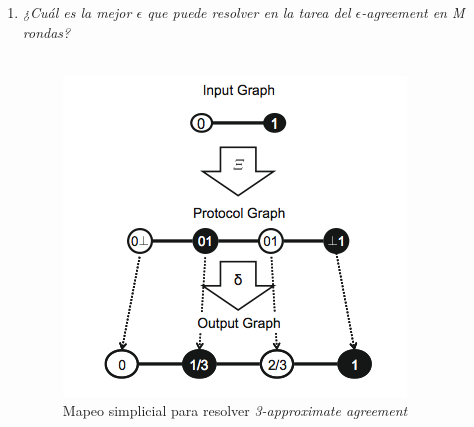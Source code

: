 \documentclass{article}
\begin{document}
\begin{enumerate}
{\begin{enumerate}
{      En la primera ronda(\textit{figura 4}) podemos decir que el complejo es el mismo
      al del problema visto en clase, esto se debe a que cada proceso ocupa el único espacio
      de memoria del cual dispone, teniendo como información inicial, lo que él dijo (0 ó 1)
      más aparte lo que leyo del otro proceso (0, 1 ó $\perp$).\\
      Lo interesante ocurre apartir de la ronda 2, ¿cuál es el complejo que resulta en la segunda
      ronda?, la respuesta es simple, el mismo complejo de la ronda 1. Aún más interesante
      ¿por que ocurre esto?, primero debemos notar que en el modelo \textit{full information} 
      saber toda la historia de la conversación que mantuvieron los dos procesos durante las M
      rondas nos da la capacidad de convertir una arista en 3 posibles mundos subsecuentes,
      como en el modelo que se nos pide en este ejercicio perdemos esa capacidad, entonces 
      no importa cuantas rondas de comuncación mantuvieron los procesos, si en todo momento solo
      existe la posibilidad de que alguno de los dos no escucho al otro o ambos se escucharon.\\
      Por lo tanto, la gráfica de vistas de la ronda M es el mostrado en la \textit{figura 4}.\\
    }
       
      \item{\textsl{¿Cuál es la mejor $\epsilon$ que puede resolver en la tarea del 
            $\epsilon$-agreement en M rondas?}\\ \\
         
          \begin{figure}
            \centering
            \includegraphics[scale=0.65]{3b_agreement.png}
            \caption{Mapeo simplicial para resolver \textit{3-approximate agreement}}
          \end{figure}
          
}
\end{enumerate}}
\end{enumerate}
\end{document}
